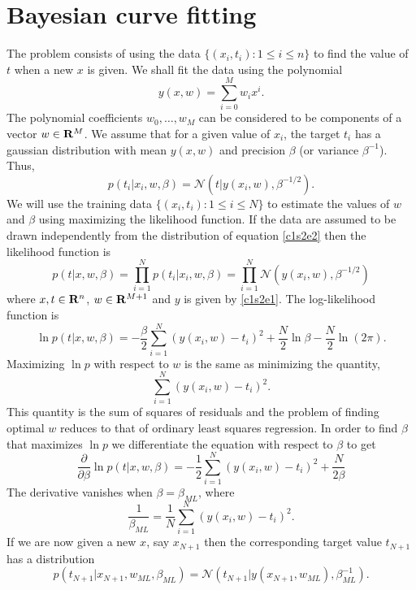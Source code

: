 \section{Bayesian curve fitting}\label{c1s2}
The problem consists of using the data $\{(x_i, t_i) : 1 \le i \le n\}$ to find the value
of $t$ when a new $x$ is given. We shall fit the data using the polynomial
\begin{equation}\label{c1s2e1}
y(x, w) = \sum_{i=0}^M w_i x^i.
\end{equation}
The polynomial coefficients $w_0, \ldots, w_M$ can be considered to be components of a 
vector $w \in \mathbf{R}^M$. We assume that for a given value of $x_i$, the target $t_i$ has a 
gaussian distribution with mean $y(x, w)$ and precision $\beta$ (or variance $\beta^{-1}$).
Thus,
\begin{equation}\label{c1s2e2}
p(t_i | x_i, w, \beta) = \mathcal{N}(t | y(x_i, w), \beta^{-1/2}).
\end{equation}
We will use the training data $\{(x_i, t_i): 1 \le i \le N\}$ to estimate the values of $w$
and $\beta$ using maximizing the likelihood function. If the data are assumed to be drawn
independently from the distribution of equation \eqref{c1s2e2} then the likelihood function
is
\[
p(t | x, w, \beta) = \prod_{i=1}^N p(t_i | x_i, w, \beta) = \prod_{i=1}^N \mathcal{N}(y(x_i, w), \beta^{-1/2})
\]
where $x, t \in \mathbf{R}^n$, $w \in \mathbf{R}^{M+1}$ and $y$ is given by \eqref{c1s2e1}. The log-likelihood
function is
\begin{equation}\label{c1s2e3}
\ln p(t|x,w,\beta) = -\frac{\beta}{2}\sum_{i=1}^N(y(x_i, w) - t_i)^2 + \frac{N}{2}\ln\beta - \frac{N}{2}\ln(2\pi).
\end{equation}
Maximizing $\ln p$ with respect to $w$ is the same as minimizing the quantity,
\begin{equation}\label{c1s2e4}
\sum_{i=1}^N(y(x_i, w) - t_i)^2.
\end{equation}
This quantity is the sum of squares of residuals and the problem of finding optimal $w$ reduces
to that of ordinary least squares regression. In order to find $\beta$ that maximizes $\ln p$
we differentiate the equation with respect to $\beta$ to get
\[
\frac{\partial}{\partial\beta}\ln p(t|x,w,\beta) = -\frac{1}{2}\sum_{i=1}^N(y(x_i, w) - t_i)^2 + \frac{N}{2\beta}
\]
The derivative vanishes when $\beta = \beta_{ML}$, where
\begin{equation}\label{c1s2e5}
\frac{1}{\beta_{ML}} = \frac{1}{N}\sum_{i=1}^N(y(x_i, w) - t_i)^2.
\end{equation}
If we are now given a new $x$, say $x_{N+1}$ then the corresponding target value $t_{N+1}$ has
a distribution
\[
p(t_{N+1} | x_{N+1}, w_{ML}, \beta_{ML}) = \mathcal{N}(t_{N+1}| y(x_{N+1}, w_{ML}), \beta_{ML}^{-1}).
\]

